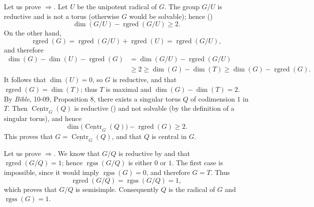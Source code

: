 Let us prove \(\Rightarrow\).  Let \(U\) be the unipotent radical
of \(G\).  The group \(G/U\) is reductive and is not a torus (otherwise
\(G\) would be solvable); hence ()
\[
  \dim(G/U)-\operatorname{rgred}(G/U)
  \geq 2.
\]
On the other hand,
\[
  \operatorname{rgred}(G)
  =
  \operatorname{rgred}(G/U)+\operatorname{rgred}(U)
  =
  \operatorname{rgred}(G/U),
\]
and therefore
\[
\begin{aligned}
  \dim(G)-\dim(U)-\operatorname{rgred}(G)
    &=\dim(G/U)-\operatorname{rgred}(G/U)\\
    &\geq 2
     \geq \dim(G)-\dim(T)
     \geq \dim(G)-\operatorname{rgred}(G).
\end{aligned}
\]
It follows that \(\dim(U)=0\), so \(G\) is reductive, and that
\(\operatorname{rgred}(G)=\dim(T)\); thus \(T\) is maximal and
\(\dim(G)-\dim(T)=2\).  By \emph{Bible}, 10-09, Proposition 8, there
exists a singular torus \(Q\) of codimension \(1\) in \(T\).  Then
\(\underline{\operatorname{Centr}}_{G}(Q)\) is reductive () and
not solvable (by the definition of a singular torus), and hence
\[
  \dim\bigl(\underline{\operatorname{Centr}}_{G}(Q)\bigr)
  -\operatorname{rgred}(G)\geq 2.
\]
This proves that
\(G=\underline{\operatorname{Centr}}_{G}(Q)\), and that \(Q\) is central
in \(G\).

Let us prove \(\Rightarrow\).  We know that \(G/Q\) is reductive
by  and that \(\operatorname{rgred}(G/Q)=1\); hence
\(\operatorname{rgss}(G/Q)\) is either \(0\) or \(1\).  The first case is
impossible, since it would imply \(\operatorname{rgss}(G)=0\), and
therefore \(G=T\).  Thus
\[
  \operatorname{rgred}(G/Q)=\operatorname{rgss}(G/Q)=1,
\]
which proves that \(G/Q\) is semisimple.  Consequently \(Q\) is the
radical of \(G\) and \(\operatorname{rgss}(G)=1\).
